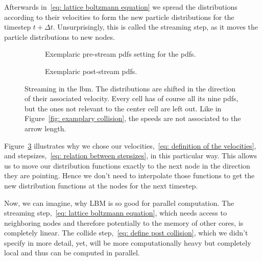 Afterwards in~\eqref{eq: lattice boltzmann equation} we spread the distributions according to their velocities to form the new particle distributions for the timestep $t+\Delta t$.
Unsurprisingly, this is called the streaming step, as it moves the particle distributions to new nodes.

\begin{figure}
\centering
\begin{subfigure}{.5\textwidth}
  \centering
  
\caption{Exemplaric pre-stream \glspl{pdf} setting for the \glspl{pdf}.}
\label{fig: pre-stream example}
\end{subfigure}%
\begin{subfigure}{.5\textwidth}
  \centering
  
  \caption{Exemplaric post-stream \glspl{pdf}.\linebreak}
\label{fig: post-stream example}
\end{subfigure}
\caption{Streaming in the \gls{lbm}.
The distributions are shifted in the direction of their associated velocity.
Every cell has of course all its nine \glspl{pdf}, but the ones not relevant to the center cell are left out.
Like in Figure~\ref{fig: examplary collision}, the speeds are not associated to the arrow length.}
\label{fig: examplary stream}
\end{figure}

Figure~\ref{fig: examplary stream} illustrates why we chose our velocities,~\eqref{eq: definition of the velocities}, and stepsizes,~\eqref{eq: relation between stepsizes}, in this particular way.
This allows us to move our distribution functions exactly to the next node in the direction they are pointing.
Hence we don't need to interpolate those functions to get the new distribution functions at the nodes for the next timestep.

Now, we can imagine, why LBM is so good for parallel computation.
The streaming step,~\eqref{eq: lattice boltzmann equation}, which needs access to neighboring nodes and therefore potentially to the memory of other cores, is completely linear.
The collide step,~\eqref{eq: define post collision}, which we didn't specify in more detail, yet, will be more computationally heavy but completely local and thus can be computed in parallel.
